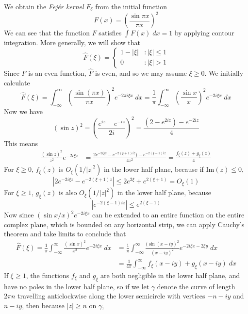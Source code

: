 \begin{example}
	We obtain the {\it Fej\'{e}r kernel} $F_\delta$ from the initial function
	\[ F(x) = \left( \frac{\sin \pi x}{\pi x} \right)^2 \]
	We can see that the function $F$ satisfies $\int F(x)\; dx = 1$ by applying contour integration. More generally, we will show that
	\[ \widehat{F}(\xi) = \begin{cases} 1 - |\xi| & : |\xi| \leq 1\\ 0 &: |\xi| > 1 \end{cases} \]
	Since $F$ is an even function, $\widehat{F}$ is even, and so we may assume $\xi \geq 0$. We initially calculate
	\[ \widehat{F}(\xi) = \int_{-\infty}^\infty \left( \frac{\sin(\pi x)}{\pi x} \right)^2 e^{- 2 \pi i \xi x}\; dx = \frac{1}{\pi} \int_{-\infty}^\infty \left( \frac{\sin x}{x} \right)^2 e^{- 2 i \xi x}\; dx \]
	Now we have
	\[ (\sin z)^2 = \left( \frac{e^{iz} - e^{-iz}}{2i} \right)^2 = \frac{(2 - e^{2iz}) - e^{-2iz}}{4} \]
	This means
	\begin{align*}
		\frac{(\sin z)^2}{z^2} e^{- 2 i \xi z} &= \frac{2e^{-2 i \xi z} - e^{-2(\xi + 1) i z}) - e^{-2(\xi - 1)iz}}{4z^2 } = \frac{f_\xi(z) + g_\xi(z)}{4}
	\end{align*}
	For $\xi \geq 0$, $f_\xi(z)$ is $O_\xi(1/|z|^2)$ in the lower half plane, because if $\text{Im}(z) \leq 0$,
	\[ |2e^{-2 i \xi z} - e^{-2(\xi + 1) z}| \leq 2e^{2\xi} + e^{2(\xi + 1)} = O_\xi(1) \]
	For $\xi \geq 1$, $g_\xi(z)$ is also $O_\xi(1/|z|^2)$ in the lower half plane, because
	\[ |e^{-2(\xi - 1)iz}| \leq e^{2(\xi - 1)}  \]
	Now since $(\sin x/x)^2 e^{-2 i \xi x}$ can be extended to an entire function on the entire complex plane, which is bounded on any horizontal strip, we can apply Cauchy's theorem and take limits to conclude that
	\begin{align*}
		\widehat{F}(\xi) = \frac{1}{\pi} \int_{-\infty}^\infty \frac{(\sin x)^2}{x^2} e^{-2 i \xi x}\; dx &= \frac{1}{\pi} \int_{-\infty}^{\infty} \frac{(\sin (x - iy)^2}{(x - iy)^2} e^{-2 i \xi x  -2 \xi y}\; dx\\
		&= \frac{1}{4 \pi} \int_{-\infty}^\infty f_\xi(x - iy) + g_\xi(x - iy)\; dx
	\end{align*}
	If $\xi \geq 1$, the functions $f_\xi$ and $g_\xi$ are both negligible in the lower half plane, and have no poles in the lower half plane, so if we let $\gamma$ denote the curve of length $2 \pi n$ travelling anticlockwise along the lower semicircle with vertices $-n - iy$ and $n - iy$, then because $|z| \geq n$ on $\gamma$,

\end{example}
